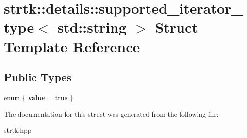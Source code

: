 \hypertarget{structstrtk_1_1details_1_1supported__iterator__type_3_01std_1_1string_01_4}{\section{strtk\-:\-:details\-:\-:supported\-\_\-iterator\-\_\-type$<$ std\-:\-:string $>$ Struct Template Reference}
\label{structstrtk_1_1details_1_1supported__iterator__type_3_01std_1_1string_01_4}
}
\subsection*{Public Types}
\begin{DoxyCompactItemize}
\item 
enum \{ {\bfseries value} = true
 \}
\end{DoxyCompactItemize}


The documentation for this struct was generated from the following file\-:\begin{DoxyCompactItemize}
\item 
strtk.\-hpp\end{DoxyCompactItemize}
